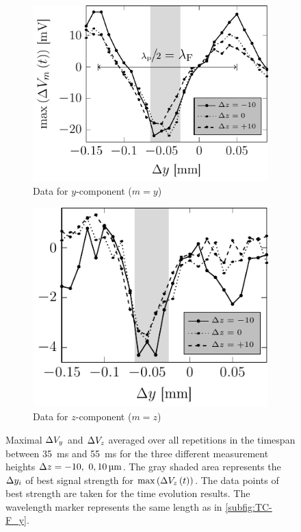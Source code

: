 \begin{figure}[ht]
  \centering
  \begin{subfigure}{\figWidth}
    \centering
    \caption{Data for $y$-component ($m = y$)}\label{subfig:TC-res_DV_y}
    \includegraphics[]{External/avgV_y_vs_dy.pdf}
  \end{subfigure}%
  \begin{subfigure}{\figWidth}
    \centering
    \caption{Data for $z$-component ($m = z$)}\label{subfig:TC-res_DV_z}
    \includegraphics[]{External/avgV_z_vs_dy.pdf}
  \end{subfigure}%
  \caption{Maximal $\Delta V_{y}$ and $\Delta V_{z}$ averaged over all repetitions in the 
    timespan between \SI{35}{\ms} and \SI{55}{\ms} for the three different 
    measurement heights $\Dz = \SIlist[list-units=single, list-final-separator 
    = {, }, list-pair-separator= {, }] {-10;0;10}{\um}$. The gray shaded area 
    represents the $\Delta y_{i}$ of best signal strength for $\max\left( 
    \Delta V_{z}\left( t \right) \right)$. The data points of best strength are 
    taken for the time evolution results. The wavelength marker represents the 
  same length as in \cref{subfig:TC-F_y}.}\label{fig:TC-DV_vs_dy}
\end{figure}%


